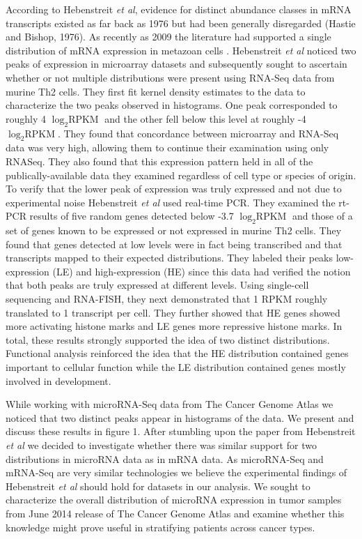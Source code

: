 \documentclass[12pt]{report}
\begin{document}
 According to Hebenstreit \emph{et al}, evidence for distinct abundance classes in mRNA transcripts existed as far back 
 as 1976 but had been generally disregarded (Hastie and Bishop, 1976). As recently as 2009 the literature 
 had supported a single distribution of mRNA expression in metazoan cells \cite{Lu2009, Ramskold2009}. 
 Hebenstreit \emph{et al} noticed two peaks of expression in microarray datasets 
 and subsequently sought to ascertain whether or not multiple distributions were 
 present using RNA-Seq data from murine Th2 cells. They first fit kernel density estimates to the data 
 to characterize the two peaks observed in histograms. One peak corresponded to roughly 4 $\log_{2} \text{RPKM}$
 and the other fell below this level  at roughly -4 $\log_{2} \text{RPKM}$. They found that concordance 
 between microarray and RNA-Seq data was very high, allowing them to continue 
 their examination using only RNASeq. They also found that this expression pattern held
 in all of the publically-available data they examined regardless of cell type or species of origin.
 To verify that the lower peak of expression was truly expressed and not due to 
 experimental noise Hebenstreit \emph{et al} used real-time PCR. They examined 
 the rt-PCR results of five random genes detected below -3.7 $\log_{2} \text{RPKM}$ 
 and those of a set of genes known to be expressed or not expressed in murine 
 Th2 cells. They found that genes detected at low levels were in fact being 
 transcribed and that transcripts mapped to their expected distributions.
  They labeled their peaks low-expression (LE) and high-expression 
 (HE) since this data had verified the notion that both peaks are truly 
 expressed at different levels. Using single-cell sequencing and RNA-FISH, they 
 next demonstrated that 1 RPKM roughly translated to 1 transcript per cell. They 
 further showed that HE genes showed more activating histone marks and LE genes 
 more repressive histone marks. In total, these results strongly supported the 
 idea of two distinct distributions. Functional analysis reinforced the idea 
 that the HE distribution contained genes important to cellular function while 
 the LE distribution contained genes mostly involved in development.
 
 While working with microRNA-Seq data from The Cancer Genome Atlas we noticed 
 that two distinct peaks appear in histograms of the data. We present and 
 discuss these results in figure 1. After stumbling upon the paper from Hebenstreit \emph{et al} 
we decided to investigate whether there was similar support for two 
distributions in microRNA data as in mRNA data. As microRNA-Seq and mRNA-Seq are 
very similar technologies we believe the experimental findings of Hebenstreit \emph{et al} 
should hold for datasets in our analysis. We sought to characterize the overall 
distribution of microRNA expression in tumor samples from June 2014 release of
The Cancer Genome Atlas and examine whether this knowledge might prove useful in 
stratifying patients across cancer types.
\end{document}

